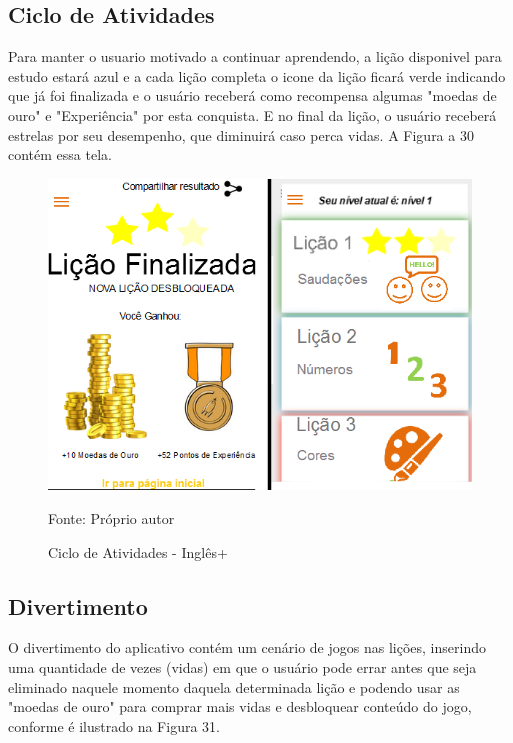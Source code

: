 \documentclass[
	12pt,				%
	openany,			%
	oneside,			%
	a4paper,			%
	english,			%
	french,				%
	spanish,			%
	brazil				%
	]{abntex2}
\begin{document}
\subsection{Ciclo de Atividades}
Para manter o usuario motivado a continuar aprendendo, a lição disponivel para estudo estará azul e a cada lição completa o icone da lição ficará verde indicando que já foi finalizada e o usuário receberá como recompensa algumas "moedas de ouro" e "Experiência" por esta conquista. E no final da lição, o usuário receberá estrelas por seu desempenho, que diminuirá caso perca vidas. A Figura a 30 contém essa tela.

\begin{figure}[H]
    \centering
\caption{Ciclo de Atividades - Inglês+}
\includegraphics[width=12cm]{figuras/ciclo-ingles+.png}
\par
 Fonte: Próprio autor
\end{figure}


\subsection{Divertimento}
O divertimento do aplicativo contém um cenário de jogos nas lições, inserindo uma quantidade de vezes (vidas) em que o usuário pode errar antes que seja eliminado naquele momento daquela determinada lição e podendo usar as "moedas de ouro" para comprar mais vidas e desbloquear conteúdo do jogo, conforme é ilustrado na Figura 31.
\end{document}
